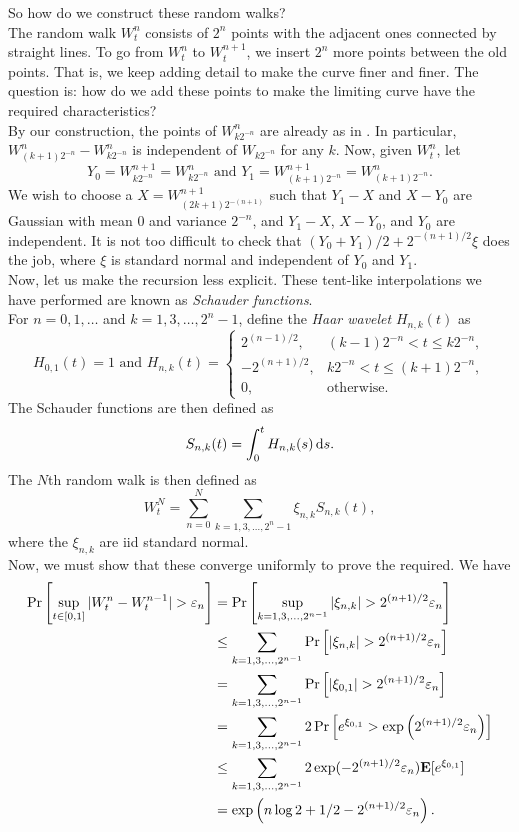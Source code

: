 So how do we construct these random walks?\\
The random walk $W_t^n$ consists of $2^n$ points with the adjacent ones connected by straight lines. To go from $W_t^n$ to $W_t^{n+1}$, we insert $2^n$ more points between the old points. That is, we keep adding detail to make the curve finer and finer. The question is: how do we add these points to make the limiting curve have the required characteristics?\\
By our construction, the points of $W_{k2^{-n}}^{n}$ are already as in . In particular, $W_{(k+1)2^{-n}}^n - W_{k2^{-n}}^n$ is independent of $W_{k2^{-n}}$ for any $k$. Now, given $W_t^n$, let
\[ Y_0 = W_{k2^{-n}}^{n+1} = W_{k2^{-n}}^n \text{ and } Y_1 = W_{(k+1)2^{-n}}^{n+1} = W_{(k+1)2^{-n}}^{n}. \]
We wish to choose a $X = W_{(2k+1)2^{-(n+1)}}^{n+1}$ such that $Y_1 - X$ and $X - Y_0$ are Gaussian with mean $0$ and variance $2^{-n}$, and $Y_1-X$, $X-Y_0$, and $Y_0$ are independent. It is not too difficult to check that $(Y_0 + Y_1)/2 + 2^{-(n+1)/2}\xi$ does the job, where $\xi$ is standard normal and independent of $Y_0$ and $Y_1$.\\

Now, let us make the recursion less explicit. These tent-like interpolations we have performed are known as \textit{Schauder functions}.\\
For $n=0,1,\ldots$ and $k=1,3,\ldots,2^n-1$, define the \textit{Haar wavelet} $H_{n,k}(t)$ as
\[
	H_{0,1}(t) = 1 \text{ and }
	H_{n,k}(t) =
	\begin{cases}
		2^{(n-1)/2}, & (k-1)2^{-n} < t \leq k2^{-n}, \\
		-2^{(n+1)/2}, & k2^{-n} < t \leq (k+1)2^{-n}, \\
		0, & \text{otherwise.}
	\end{cases}
\]
The Schauder functions are then defined as
\[ S_{n,k}(t) = \int_0^t H_{n,k}(s)\operatorname{d}\!{s}. \]
The $N$th random walk is then defined as
\[ W_t^N = \sum_{n=0}^N \sum_{k=1,3,\ldots,2^n-1} \xi_{n,k} S_{n,k}(t), \]
where the $\xi_{n,k}$ are iid standard normal.\\
Now, we must show that these converge uniformly to prove the required.
We have
\begin{align*}
	\Pr\left[\sup_{t\in[0,1]} |W_t^n - W_t^{n-1}| > \varepsilon_n\right] &= \Pr\left[\sup_{k = 1,3,\ldots,2^{n-1}} |\xi_{n,k}| > 2^{(n+1)/2}\varepsilon_n\right] \\
		&\leq \sum_{k=1,3,\ldots,2^{n-1}} \Pr\left[|\xi_{n,k}| > 2^{(n+1)/2}\varepsilon_n\right] \\
		&= \sum_{k=1,3,\ldots,2^{n-1}} \Pr\left[|\xi_{0,1}| > 2^{(n+1)/2}\varepsilon_n\right] \\
		&= \sum_{k=1,3,\ldots,2^{n-1}} 2\Pr\left[e^{\xi_{0,1}} > \exp\left(2^{(n+1)/2}\varepsilon_n\right)\right] \\
		&\leq \sum_{k=1,3,\ldots,2^{n-1}} 2\exp(-2^{(n+1)/2}\varepsilon_n) \textbf{E}[e^{\xi_{0,1}}] \\
		&= \exp\left(n\log 2 + 1/2 - 2^{(n+1)/2}\varepsilon_n\right).
\end{align*}

